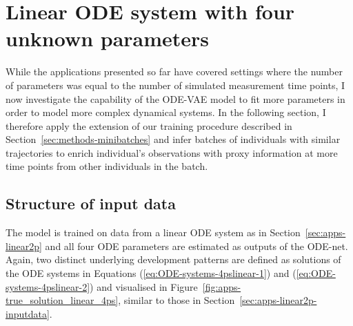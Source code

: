 \section{Linear ODE system with four unknown parameters}\label{sec:apps-linear4p}

While the applications presented so far have covered settings where the number of parameters was equal to the number of simulated measurement time points, I now investigate the capability of the ODE-VAE model to fit more parameters in order to model more complex dynamical systems. In the following section, I therefore apply the extension of our training procedure described in Section~\ref{sec:methods-minibatches} and infer batches of individuals with similar trajectories to enrich individual's observations with proxy information at more time points from other individuals in the batch. 

\subsection{Structure of input data}

The model is trained on data from a linear ODE system as in Section~\ref{sec:apps-linear2p} and all four ODE parameters are estimated as outputs of the ODE-net. Again, two distinct underlying development patterns are defined as solutions of the ODE systems in Equations (\ref{eq:ODE-systems-4pslinear-1}) and (\ref{eq:ODE-systems-4pslinear-2}) and visualised in Figure~\ref{fig:apps-true_solution_linear_4ps}, similar to those in Section~\ref{sec:apps-linear2p-inputdata}. 

